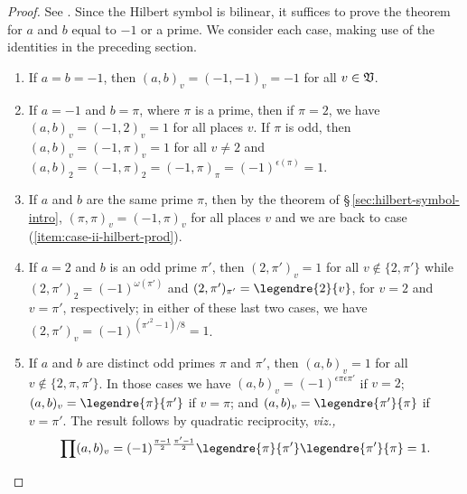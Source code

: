 \begin{proof}
    See \cite[p.~23]{weismann2006annotations}. Since the Hilbert symbol is bilinear, it suffices to prove the theorem for \(a\) and \(b\) equal to \(-1\) or a prime. We consider each case, making use of the identities in the preceding section.

    \smallskip

    \begin{enumerate}[nosep, label=(\roman*), wide]
        \item If \(a = b = -1\), then \((a, b)_v = (-1, -1)_v = -1\) for all \(v \in \mathfrak{V}\).
        \item If \(a = -1\) and \(b = \pi\), where \(\pi\) is a prime, then if \(\pi = 2\), we have \((a, b)_v = (-1, 2)_v = 1\) for all places \(v\). If \(\pi\) is odd, then \((a, b)_v = (-1, \pi)_v = 1\) for all \(v \neq 2\) and \((a, b)_2 = (-1, \pi)_2 = (-1, \pi)_{\pi} = (-1)^{\epsilon(\pi)} = 1\).\label{item:case-ii-hilbert-prod}
        \item If \(a\) and \(b\) are the same prime \(\pi\), then by the theorem of \S\,\ref{sec:hilbert-symbol-intro}, \((\pi, \pi)_v = (-1, \pi)_v\) for all places \(v\) and we are back to case (\ref{item:case-ii-hilbert-prod}).
        \item If \(a = 2\) and \(b\) is an odd prime \(\pi'\), then \((2, \pi')_v = 1\) for all \(v \notin \{2, \pi'\}\) while \((2, \pi')_2 = (-1)^{\omega(\pi')}\) and \((2, \pi')_{\pi'} = \legendre{2}{v}\), for \(v = 2\) and \(v = \pi'\), respectively; in either of these last two cases, we have \((2, \pi')_v = (-1)^{(\pi'^2 - 1)/8} = 1\).
        \item If \(a\) and \(b\) are distinct odd primes \(\pi\) and \(\pi'\), then \((a,b)_v = 1\) for all \(v \notin \{2, \pi, \pi'\}\). In those cases we have \((a, b)_v = (-1)^{\epsilon{\pi}\epsilon{\pi'}}\) if \(v = 2\); \((a, b)_v = \legendre{\pi}{\pi'}\) if \(v = \pi\); and \((a, b)_v = \legendre{\pi'}{\pi}\) if \(v = \pi'\). The result follows by quadratic reciprocity, \emph{viz.,}
        \[
            \prod (a, b)_v =  (-1)^{\frac{\pi-1}{2}\frac{\pi'-1}{2}} \legendre{\pi}{\pi'} \legendre{\pi'}{\pi} = 1.
        \]
    \end{enumerate}
\end{proof}

